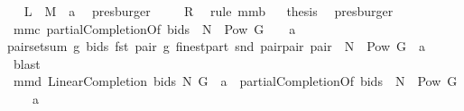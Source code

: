 \begin{isabellebody}
\ \isamarkupfalse%
\ {\isachardoublequoteopen}{\isacharquery}L\ {\isacharequal}\ {\isacharparenleft}{\isacharquery}M\ {\isacharbar}{\isacharbar}\ a{\isacharparenright}{\isachardoublequoteclose}\ \isamarkupfalse%
\ presburger\isanewline
{}\isamarkupfalse%
\ \isamarkupfalse%
\ {\isachardoublequoteopen}{\isachardot}{\isachardot}{\isachardot}\ {\isacharequal}\ {\isacharquery}R{\isachardoublequoteclose}\ \isamarkupfalse%
\ {\isacharparenleft}rule\ mm{}{}b{\isacharparenright}\isanewline
{}\isamarkupfalse%
\ \isamarkupfalse%
\ {\isacharquery}thesis\ \isamarkupfalse%
\ presburger\isanewline
{}\isamarkupfalse%
%
\endisatagproof
{\isafoldproof}%
%
\isadelimproof
%
\endisadelimproof
\isanewline
{}\isamarkupfalse%
\ mm{}{}c{\isacharcolon}\ {\isachardoublequoteopen}{\isacharparenleft}partialCompletionOf\ bids{\isacharparenright}\ {\isacharbackquote}\ {\isacharparenleft}{\isacharparenleft}N\ {\isasymtimes}\ {\isacharparenleft}Pow\ G\ {\isacharminus}\ {\isacharbraceleft}{\isacharbraceleft}{\isacharbraceright}{\isacharbraceright}{\isacharparenright}{\isacharparenright}\ {\isasyminter}\ a{\isacharparenright}\ {\isacharequal}\ \isanewline
{\isacharbraceleft}{\isacharparenleft}pair{\isacharcomma}setsum\ {\isacharparenleft}{\isacharpercent}g{\isachardot}\ bids\ {\isacharparenleft}fst\ pair{\isacharcomma}\ g{\isacharparenright}{\isacharparenright}\ {\isacharparenleft}finestpart\ {\isacharparenleft}snd\ pair{\isacharparenright}{\isacharparenright}{\isacharparenright}{\isacharbar}pair{\isachardot}\ pair\ {\isasymin}\ {\isacharparenleft}N\ {\isasymtimes}\ {\isacharparenleft}Pow\ G{\isacharminus}{\isacharbraceleft}{\isacharbraceleft}{\isacharbraceright}{\isacharbraceright}{\isacharparenright}{\isacharparenright}\ {\isasyminter}\ a{\isacharbraceright}{\isachardoublequoteclose}\isanewline
%
\isadelimproof
%
\endisadelimproof
%
\isatagproof
{}\isamarkupfalse%
\ blast%
\endisatagproof
{\isafoldproof}%
%
\isadelimproof
\isanewline
%
\endisadelimproof
{}\isamarkupfalse%
\ mm{}{}d{\isacharcolon}\ {\isachardoublequoteopen}{\isacharparenleft}LinearCompletion\ bids\ N\ G{\isacharparenright}\ {\isacharbar}{\isacharbar}\ a\ {\isacharequal}\ {\isacharparenleft}partialCompletionOf\ bids{\isacharparenright}\ {\isacharbackquote}\ {\isacharparenleft}{\isacharparenleft}N\ {\isasymtimes}\ {\isacharparenleft}Pow\ G\ {\isacharminus}\ {\isacharbraceleft}{\isacharbraceleft}{\isacharbraceright}{\isacharbraceright}{\isacharparenright}{\isacharparenright}\ {\isasyminter}\ a{\isacharparenright}{\isachardoublequoteclose}\isanewline

\end{isabellebody}
